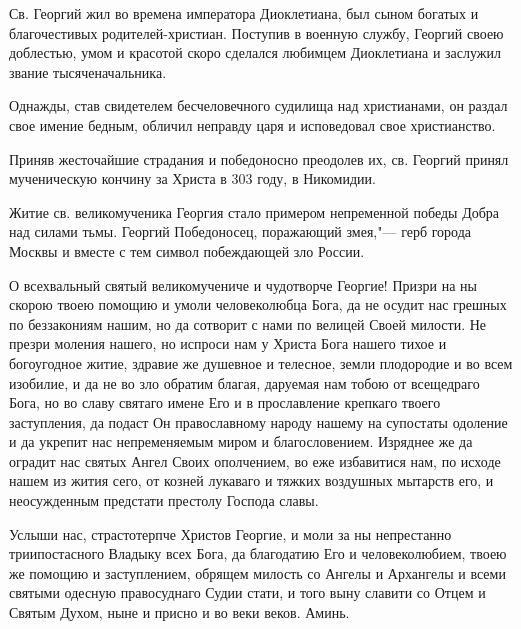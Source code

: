 \begin{mymulticols}


Св. Георгий жил во времена императора Диоклетиана, был сыном богатых и благочестивых родителей-христиан. Поступив в военную службу, Георгий своею доблестью, умом и красотой скоро сделался любимцем Диоклетиана и заслужил звание тысяченачальника.

Однажды, став свидетелем бесчеловечного судилища над христианами, он раздал свое имение бедным, обличил неправду царя и исповедовал свое христианство.

Приняв жесточайшие страдания и победоносно преодолев их, св. Георгий принял мученическую кончину за Христа в 303 году, в Никомидии.

Житие св. великомученика Георгия стало примером непременной победы Добра над силами тьмы. Георгий Победоносец, поражающий змея,"--- герб города Москвы и вместе с тем символ побеждающей зло России.



О всехвальный святый великомучениче и чудотворче Георгие! Призри на ны скорою твоею помощию и умоли человеколюбца Бога, да не осудит нас грешных по беззакониям нашим, но да сотворит с нами по велицей Своей милости. Не презри моления нашего, но испроси нам у Христа Бога нашего тихое и богоугодное житие, здравие же душевное и телесное, земли плодородие и во всем изобилие, и да не во зло обратим благая, даруемая нам тобою от всещедраго Бога, но во славу святаго имене Его и в прославление крепкаго твоего заступления, да подаст Он православному народу нашему на супостаты одоление и да укрепит нас непременяемым миром и благословением. Изряднее же да оградит нас святых Ангел Своих ополчением, во еже избавитися нам, по исходе нашем из жития сего, от козней лукаваго и тяжких воздушных мытарств его, и неосужденным предстати престолу Господа славы.

Услыши нас, страстотерпче Христов Георгие, и моли за ны непрестанно триипостасного Владыку всех Бога, да благодатию Его и человеколюбием, твоею же помощию и заступлением, обрящем милость со Ангелы и Архангелы и всеми святыми одесную правосуднаго Судии стати, и того выну славити со Отцем и Святым Духом, ныне и присно и во веки веков. Аминь.

\end{mymulticols}

\mychapterending



